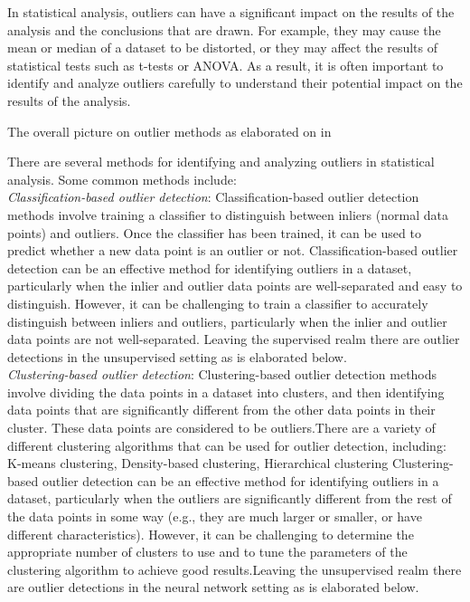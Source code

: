 \documentclass[11pt]{article}
\theoremstyle{definition}
\begin{document}
In statistical analysis, outliers can have a significant impact on the results of the analysis and the conclusions that are drawn. For example, they may cause the mean or median of a dataset to be distorted, or they may affect the results of statistical tests such as t-tests or ANOVA. As a result, it is often important to identify and analyze outliers carefully to understand their potential impact on the results of the analysis.

The overall picture on outlier methods as elaborated on in \cite{outliersurvey}

There are several methods for identifying and analyzing outliers in statistical analysis. Some common methods include:\\

\textit{Classification-based outlier detection}: Classification-based outlier detection methods involve training a classifier to distinguish between inliers (normal data points) and outliers. Once the classifier has been trained, it can be used to predict whether a new data point is an outlier or not. Classification-based outlier detection can be an effective method for identifying outliers in a dataset, particularly when the inlier and outlier data points are well-separated and easy to distinguish. However, it can be challenging to train a classifier to accurately distinguish between inliers and outliers, particularly when the inlier and outlier data points are not well-separated. Leaving the supervised realm there are outlier detections in the unsupervised setting as is elaborated below.\\


\textit{Clustering-based outlier detection}: Clustering-based outlier detection methods involve dividing the data points in a dataset into clusters, and then identifying data points that are significantly different from the other data points in their cluster. These data points are considered to be outliers.There are a variety of different clustering algorithms that can be used for outlier detection, including: K-means clustering, Density-based clustering, Hierarchical clustering Clustering-based outlier detection can be an effective method for identifying outliers in a dataset, particularly when the outliers are significantly different from the rest of the data points in some way (e.g., they are much larger or smaller, or have different characteristics). However, it can be challenging to determine the appropriate number of clusters to use and to tune the parameters of the clustering algorithm to achieve good results.Leaving the unsupervised realm there are outlier detections in the neural network setting as is elaborated below.\\
\end{document}
